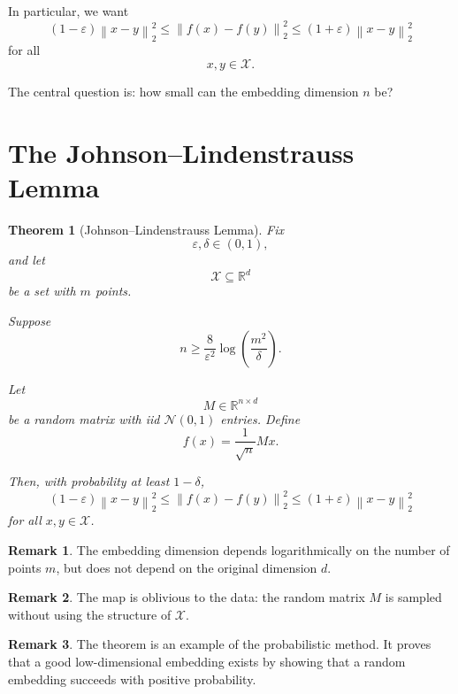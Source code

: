 \documentclass[12pt,oneside]{book}
\numberwithin{equation}{section}
\theoremstyle{definition}
\newtheorem{remark}{Remark}[section]
\theoremstyle{plain}
\newtheorem{theorem}{Theorem}[section]
\theoremstyle{remark}
\newcommand{\R}{\mathbb{R}}
\newcommand{\norm}[1]{\left\lVert #1 \right\rVert}
\newcommand{\Normal}{\mathcal{N}}
\begin{document}
In particular, we want
\[
(1-\varepsilon)\norm{x-y}_2^2
\leq
\norm{f(x)-f(y)}_2^2
\leq
(1+\varepsilon)\norm{x-y}_2^2
\]
for all
\[
x,y\in\mathcal{X}.
\]

The central question is: how small can the embedding dimension $n$ be?

\section{The Johnson--Lindenstrauss Lemma}

\begin{theorem}[Johnson--Lindenstrauss Lemma]
Fix
\[
\varepsilon,\delta\in(0,1),
\]
and let
\[
\mathcal{X}\subseteq \R^d
\]
be a set with $m$ points.

Suppose
\[
n
\geq
\frac{8}{\varepsilon^2}
\log\left(\frac{m^2}{\delta}\right).
\]

Let
\[
M\in\R^{n\times d}
\]
be a random matrix with iid $\Normal(0,1)$ entries. Define
\[
f(x)=\frac{1}{\sqrt{n}}Mx.
\]

Then, with probability at least $1-\delta$,
\[
(1-\varepsilon)\norm{x-y}_2^2
\leq
\norm{f(x)-f(y)}_2^2
\leq
(1+\varepsilon)\norm{x-y}_2^2
\]
for all $x,y\in\mathcal{X}$.
\end{theorem}

\begin{remark}
The embedding dimension depends logarithmically on the number of points $m$, but does not depend on the original dimension $d$.
\end{remark}

\begin{remark}
The map is oblivious to the data: the random matrix $M$ is sampled without using the structure of $\mathcal{X}$.
\end{remark}

\begin{remark}
The theorem is an example of the probabilistic method. It proves that a good low-dimensional embedding exists by showing that a random embedding succeeds with positive probability.
\end{remark}
\end{document}
